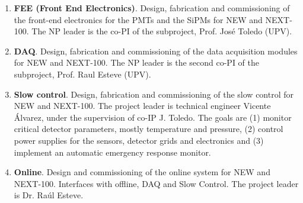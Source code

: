 \begin{enumerate}

\item {\bf FEE (Front End Electronics)}. Design, fabrication and commissioning of the front-end electronics for the PMTs and the SiPMs for NEW and NEXT-100. The NP leader is the co-PI of the subproject, Prof. Jos\'e Toledo (UPV).
 
\item {\bf DAQ}. Design, fabrication and commissioning of the data acquisition modules for NEW and NEXT-100. The NP leader is the second co-PI of the subproject, Prof. Raul Esteve (UPV).

\item {\bf Slow control}. Design, fabrication and commissioning of the slow control for NEW and NEXT-100. The project leader is technical engineer Vicente Álvarez, under the supervision of co-IP J. Toledo. The goals are (1) monitor critical detector parameters, mostly temperature and pressure, (2) control power supplies for the sensors, detector grids and electronics and (3) implement an automatic emergency response monitor.

\item {\bf Online}. Design and commissioning of the online system for NEW and NEXT-100. Interfaces with offline, DAQ and Slow Control. The project leader is Dr. Raúl Esteve. 

\end{enumerate}